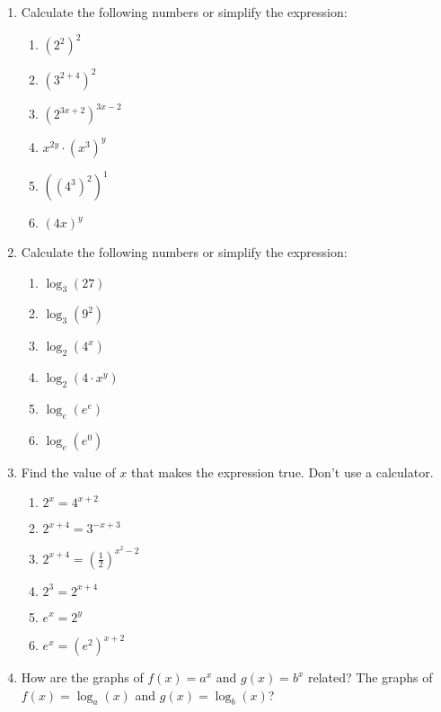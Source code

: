 \documentclass{article}
\begin{document}
\begin{enumerate}
\item Calculate the following numbers or simplify the expression:
  \begin{multicols}{3}
    \begin{enumerate}
      \setlength\itemsep{4em}
    \item $(2^2)^2$
    \item $(3^{2 + 4})^2$
    \item $(2^{3x + 2})^{3x-2}$
    \item $ x^{2y} \cdot (x^3)^{y}$
    \item $((4^3)^2)^1$
    \item $(4x)^y$
    \end{enumerate}
  \end{multicols}
  \vspace{3em}
\item Calculate the following numbers or simplify the expression:
  \begin{multicols}{3}
    \begin{enumerate}
      \setlength\itemsep{3em}
    \item $\log_3(27)$
    \item $\log_3(9^2)$
    \item $\log_2(4^x)$
    \item $\log_2(4 \cdot x^y)$
    \item $\log_e(e^e)$
    \item $\log_e(e^0)$
    \end{enumerate}
  \end{multicols}
  \vspace{3em}
\item Find the value of $x$ that makes the expression true. Don't use a calculator.
  \begin{multicols}{2}
    \begin{enumerate}
      \setlength\itemsep{4em}
    \item $2^x = 4^{x + 2}$
    \item $2^{x + 4} = 3^{-x + 3}$
    \item $2^{x + 4} = (\frac{1}{2})^{x^2 - 2}$
    \item $2^3 = 2^{x + 4}$
    \item $e^x = 2^y$
    \item $ e^x = (e^2)^{x+2} $
    \end{enumerate}
  \end{multicols}
  \vspace{3em}
  \item How are the graphs of $f(x) = a^x$ and $g(x) = b^x$ related? The graphs of $f(x) = \log_a(x)$ and $g(x) = \log_b(x)$?
\end{enumerate}
\end{document}
